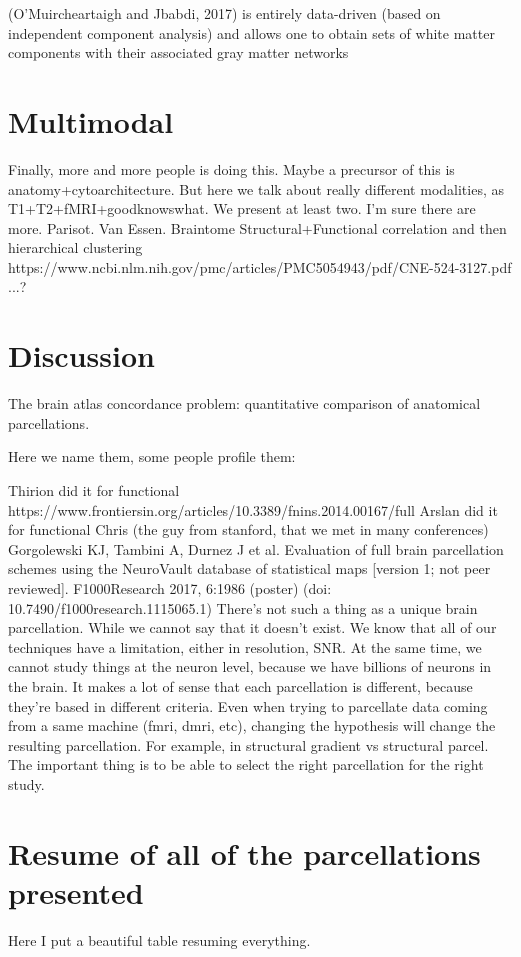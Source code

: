 (O'Muircheartaigh and Jbabdi, 2017) is entirely data-driven (based on independent component analysis) and allows one to obtain sets of white matter components with their associated gray matter networks \cite{Muircheartaigh2018}


\section{Multimodal}
Finally, more and more people is doing this. Maybe a precursor of this is
anatomy+cytoarchitecture. But here we talk about really different modalities,
as T1+T2+fMRI+goodknowswhat. We present at least two. I'm sure there are more.
Parisot.
Van Essen.
Braintome\cite{Fan2016}
Structural+Functional correlation and then hierarchical clustering\cite{Diez2014}
https://www.ncbi.nlm.nih.gov/pmc/articles/PMC5054943/pdf/CNE-524-3127.pdf
...?

\section{Discussion}
The brain atlas concordance problem: quantitative comparison of anatomical parcellations.

Here we name them, some people profile them:

Thirion did it for functional https://www.frontiersin.org/articles/10.3389/fnins.2014.00167/full %
Arslan did it for functional \cite{Arslan2018}
Chris (the guy from stanford, that we met in many conferences) Gorgolewski KJ, Tambini A, Durnez J et al. Evaluation of full brain parcellation schemes using the NeuroVault database of statistical maps [version 1; not peer reviewed]. F1000Research 2017, 6:1986 (poster) (doi: 10.7490/f1000research.1115065.1) 
There's not such a thing as a unique brain parcellation. While we cannot say
that it doesn't exist. We know that all of our techniques have a limitation,
either in resolution, SNR. At the same time, we cannot study things at the
neuron level, because we have billions of neurons in the brain. It makes a
lot of sense that each parcellation is different, because they're based
in different criteria. Even when trying to parcellate data coming from a
same machine (fmri, dmri, etc), changing the hypothesis will change the 
resulting parcellation. For example, in structural gradient vs structural
parcel. The important thing is to be able to select the right parcellation
for the right study.

\section{Resume of all of the parcellations presented}
Here I put a beautiful table resuming everything.

